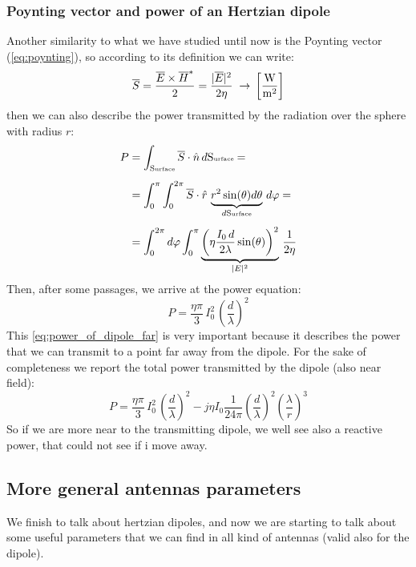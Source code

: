 \subsubsection*{Poynting vector and power of an Hertzian dipole}
Another similarity to what we have studied until now is the Poynting vector (\cref{eq:poynting}), so according to its definition we can write:
\begin{equation}
        \overline{S}=\frac{\overline{E}\times\overline{H}^*}{2}=\frac{|\overline{E}|^2}{2\eta}\;\rightarrow\,\left[\si{\frac{\watt}{\metre^2}}\right]
\end{equation}
then we can also describe the power transmitted by the radiation over the sphere with radius $r$:
\begin{align}
    \begin{split}
        P&=\int_{\text{S\tiny{urface}}}\overline{S}\cdot\hat{n}\, d\text{S\tiny{urface}}=\\[5pt]
        &=\int_0^\pi\int_0^{2\pi}\overline{S}\cdot\hat{r}\,\underbrace{r^2\sin(\theta)d\theta}_{d\text{S\tiny{urface}}}\,d\varphi=\\[5pt]
        &=\int_0^{2\pi}d\varphi\int_0^\pi \underbrace{\left(\eta\frac{I_0\,d}{2\lambda}\sin(\theta)\right)^2}_{|E|^2}\,\frac{1}{2\eta}
    \end{split}
\end{align}
Then, after some passages, we arrive at the power equation:
\begin{equation}\label{eq:power_of_dipole_far}
    P=\frac{\eta \pi}{3}\,I_0^2\,\left(\frac{d}{\lambda}\right)^2
\end{equation}
This \cref{eq:power_of_dipole_far} is very important because it describes the power that we can transmit to a point far away from the dipole. For the sake of completeness we report the total power transmitted by the dipole (also near field):
\begin{equation}
    P=\frac{\eta \pi}{3}\,I_0^2\,\left(\frac{d}{\lambda}\right)^2-j\eta I_0\frac{1}{24\pi}\left(\frac{d}{\lambda}\right)^2\left(\frac{\lambda}{r}\right)^3
\end{equation}
So if we are more near to the transmitting dipole, we well see also a reactive power, that could not see if i move away.
\subsection*{More general antennas parameters}
We finish to talk about hertzian dipoles, and now we are starting to talk about some useful parameters that we can find in all kind of antennas (valid also for the dipole).
